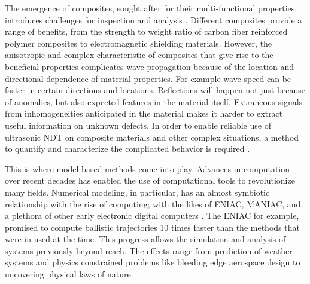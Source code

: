 The emergence of composites, sought after for their multi-functional properties, introduces challenges for inspection and analysis \autocites{inceOverviewEmergingHybrid2023, yangUltrasonicDetectionMethods2023, dwivediAdvancesResearchesNon2018, nivenFullWaveformInversion2020}. Different composites provide a range of benefits, from the strength to weight ratio of carbon fiber reinforced polymer composites to electromagnetic shielding materials. However, the anisotropic and complex characteristic of composites that give rise to the beneficial properties complicates wave propagation because of the location and directional dependence of material properties. For example wave speed can be faster in certain directions and locations. Reflections will happen not just because of anomalies, but also expected features in the material itself. Extraneous signals from inhomogeneities anticipated in the material makes it harder to extract useful information on unknown defects. In order to enable reliable use of ultrasonic NDT on composite materials and other complex situations, a method to quantify and characterize the complicated behavior is required \autocite{maioUltrasoundPropagationComposite2022}.

This is where model based methods come into play. Advances in computation over recent decades has enabled the use of computational tools to revolutionize many fields. Numerical modeling, in particular, has an almost symbiotic relationship with the rise of computing; with the likes of ENIAC, MANIAC, and a plethora of other early electronic digital computers \autocite{andersonScientificUsesMANIAC1986}. The ENIAC for example, promised to compute ballistic trajectories 10 times faster than the methods that were in used at the time. This progress allows the simulation and analysis of systems previously beyond reach. The effects range from prediction of weather systems and physics constrained problems like bleeding edge aerospace design to uncovering physical laws of nature.


